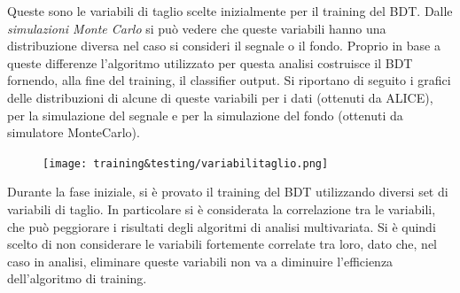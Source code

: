         
   Queste sono le variabili di taglio scelte inizialmente per il training del BDT. Dalle \textit{simulazioni Monte Carlo} si può vedere che queste variabili hanno una distribuzione diversa nel caso si consideri il segnale o il fondo. Proprio in base a queste differenze l'algoritmo utilizzato per questa analisi costruisce il BDT fornendo, alla fine del training, il classifier output. Si riportano di seguito i grafici delle distribuzioni di alcune di queste variabili per i dati (ottenuti da ALICE), per la simulazione del segnale e per la simulazione del fondo (ottenuti da simulatore MonteCarlo).
   
    \begin{figure}[htbp] %
        \centering
        \texttt{[image: training\&testing/variabilitaglio.png]}
        \caption{}
        \label{fig:variabilitaglio}
    \end{figure}
   
   
    Durante la fase iniziale, si è provato il training del BDT utilizzando diversi set di variabili di taglio. In particolare si è considerata la correlazione tra le variabili, che può peggiorare i risultati degli algoritmi di analisi multivariata. Si è quindi scelto di non considerare le variabili fortemente correlate tra loro, dato che, nel caso in analisi, eliminare queste variabili non va a diminuire l'efficienza dell'algoritmo di training. 
    \\
    
